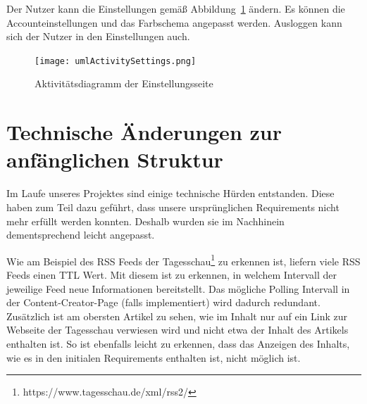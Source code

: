Der Nutzer kann die Einstellungen gemäß Abbildung~\ref{fig:umlActivitySettings.png} ändern.
Es können die Accounteinstellungen und das Farbschema angepasst werden.
Ausloggen kann sich der Nutzer in den Einstellungen auch.
\begin{figure}
    \texttt{[image: umlActivitySettings.png]}
    \caption{Aktivitätsdiagramm der Einstellungsseite}
    \label{fig:umlActivitySettings.png}
\end{figure}


\section{Technische Änderungen zur anfänglichen Struktur} \label{tech_changes}
Im Laufe unseres Projektes sind einige technische Hürden entstanden. Diese haben zum Teil dazu geführt, dass unsere ursprünglichen Requirements nicht mehr erfüllt werden konnten.
Deshalb wurden sie im Nachhinein dementsprechend leicht angepasst.

\begin{table}[h]
\caption{Tabelle – Änderungen zur anfänglichen Struktur}
\end{table}

Wie am Beispiel des RSS Feeds der Tagesschau\footnote{https://www.tagesschau.de/xml/rss2/} zu erkennen ist, liefern viele RSS Feeds einen TTL Wert.
Mit diesem ist zu erkennen, in welchem Intervall der jeweilige Feed neue Informationen bereitstellt. Das mögliche Polling Intervall in der Content-Creator-Page (falls implementiert) wird dadurch redundant.
Zusätzlich ist am obersten Artikel zu sehen, wie im Inhalt nur auf ein Link zur Webseite der Tagesschau verwiesen wird und nicht etwa der Inhalt des Artikels enthalten ist.
So ist ebenfalls leicht zu erkennen, dass das Anzeigen des Inhalts, wie es in den initialen Requirements enthalten ist, nicht möglich ist.

